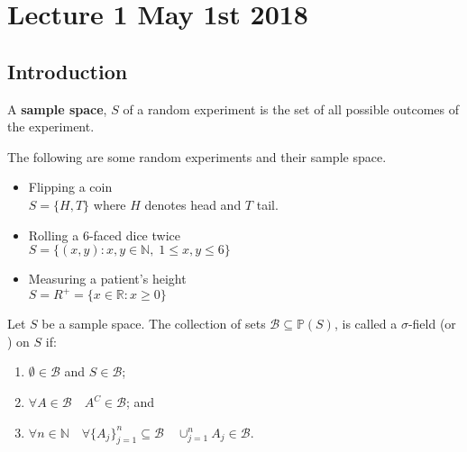 \documentclass[notoc,notitlepage]{tufte-book}
\begin{document}
\chapter{Lecture 1 May 1st 2018}
  \label{chapter:lecture_1_may_1st_2018}

\section{Introduction} %
\label{sec:introduction}

\begin{defn}\label{defn:sample_space}
  A \textbf{sample space}, \textbf{$S$} of a random experiment is the set of all possible outcomes of the experiment.
\end{defn}

\begin{eg}
  \label{eg:sample_space_eg}
  The following are some random experiments and their sample space.
  \begin{itemize}
    \item Flipping a coin\\
      $S = \{H, T\}$ where $H$ denotes head and $T$ tail.
    \item Rolling a 6-faced dice twice\\
      $S = \{(x, y) : x, y \in \mathbb{N}, \; 1 \leq x, y \leq 6 \}$
    \item Measuring a patient's height\\
      $S = R^+ = \{x \in \mathbb{R} : x \geq 0\}$
  \end{itemize}
\end{eg}

\begin{defn}\label{defn:sigma_field}
  Let $S$ be a sample space. The collection of sets $\mathscr{B} \subseteq \mathbb{P}(S)$, is called a $\sigma$-field (or ) on $S$ if:
  \begin{enumerate}
    \item $\emptyset \in \mathscr{B}$ and $S \in \mathscr{B}$;
    \item $\forall A \in \mathscr{B} \quad A^C \in \mathscr{B}$;  and
    \item $\forall n \in \mathbb{N} \quad \forall \{A_j\}_{j = 1}^{n} \subseteq \mathscr{B} \quad \cup_{j=1}^{n} A_j \in \mathscr{B}$.
  \end{enumerate}
\end{defn}
\end{document}
